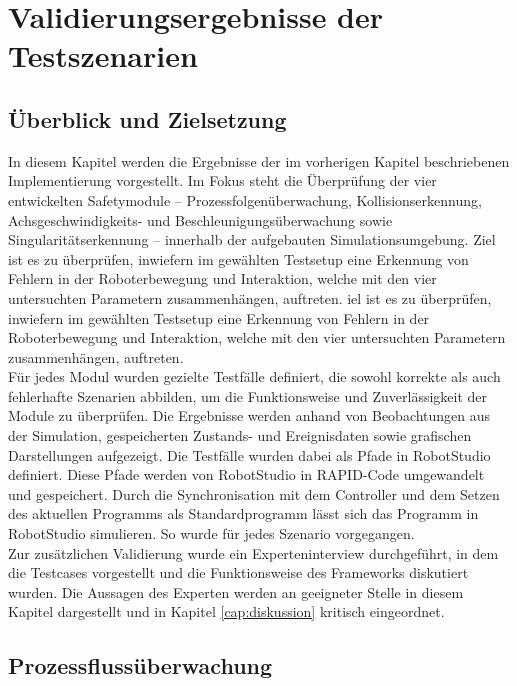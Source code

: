 \chapter{Validierungsergebnisse der Testszenarien}
\label{cap:Ergebnisse}

\section{Überblick und Zielsetzung}

In diesem Kapitel werden die Ergebnisse der im vorherigen Kapitel beschriebenen
Implementierung vorgestellt. Im Fokus steht die Überprüfung der vier
entwickelten Safetymodule – Prozessfolgenüberwachung, Kollisionserkennung,
Achsgeschwindigkeits- und Beschleunigungsüberwachung sowie
Singularitätserkennung – innerhalb der aufgebauten Simulationsumgebung. Ziel ist
es zu überprüfen, inwiefern im gewählten Testsetup eine Erkennung von Fehlern in
der Roboterbewegung und Interaktion, welche mit den vier untersuchten Parametern
zusammenhängen, auftreten. iel ist es zu überprüfen, inwiefern im gewählten
Testsetup eine Erkennung von Fehlern in der Roboterbewegung und Interaktion,
welche mit den vier untersuchten Parametern zusammenhängen, auftreten.\\

\noindent
Für jedes Modul wurden gezielte Testfälle definiert, die sowohl korrekte als
auch fehlerhafte Szenarien abbilden, um die Funktionsweise und Zuverlässigkeit
der Module zu überprüfen. Die Ergebnisse werden anhand von Beobachtungen aus der
Simulation, gespeicherten Zustands- und Ereignisdaten sowie grafischen
Darstellungen aufgezeigt. Die Testfälle wurden dabei als Pfade in RobotStudio
definiert. Diese Pfade werden von RobotStudio in RAPID-Code umgewandelt und
gespeichert. Durch die Synchronisation mit dem Controller und dem Setzen des
aktuellen Programms als Standardprogramm lässt sich das Programm in RobotStudio
simulieren. So wurde für jedes Szenario vorgegangen.\\

\noindent
Zur zusätzlichen Validierung wurde ein Experteninterview durchgeführt, in dem
die Testcases vorgestellt und die Funktionsweise des Frameworks diskutiert
wurden. Die Aussagen des Experten werden an geeigneter Stelle in diesem Kapitel
dargestellt und in Kapitel \ref{cap:diskussion} kritisch eingeordnet.
\newpage
\section{Prozessflussüberwachung}
\label{sec:processauswertung}

